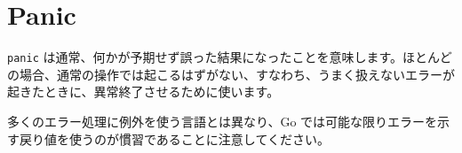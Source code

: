 \section{Panic}

\texttt{panic} は通常、何かが予期せず誤った結果になったことを意味します。ほとんどの場合、通常の操作では起こるはずがない、すなわち、うまく扱えないエラーが起きたときに、異常終了させるために使います。




多くのエラー処理に例外を使う言語とは異なり、Go では可能な限りエラーを示す戻り値を使うのが慣習であることに注意してください。